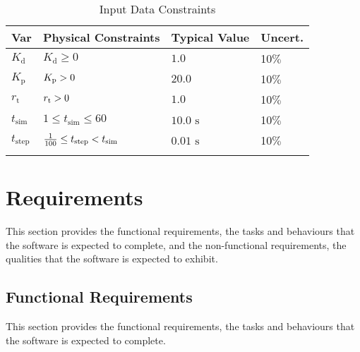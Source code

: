 \documentclass[12pt]{article}
\newcommand{\gt}{\ensuremath >}
\newcommand{\lt}{\ensuremath <}
\begin{document}
\begin{longtable}{l l l l}
\toprule
\textbf{Var} & \textbf{Physical Constraints} & \textbf{Typical Value} & \textbf{Uncert.}
\\
\midrule
\endhead
${K_{\text{d}}}$ & ${K_{\text{d}}}\geq{}0$ & $1.0$ & 10$\%$
\\
${K_{\text{p}}}$ & ${K_{\text{p}}}\gt{}0$ & $20.0$ & 10$\%$
\\
${r_{\text{t}}}$ & ${r_{\text{t}}}\gt{}0$ & $1.0$ & 10$\%$
\\
${t_{\text{sim}}}$ & $1\leq{}{t_{\text{sim}}}\leq{}60$ & $10.0$ ${\text{s}}$ & 10$\%$
\\
${t_{\text{step}}}$ & $\frac{1}{100}\leq{}{t_{\text{step}}}\lt{}{t_{\text{sim}}}$ & $0.01$ ${\text{s}}$ & 10$\%$
\\
\bottomrule
\caption{Input Data Constraints}
\label{Table:InDataConstraints}
\end{longtable}
\section{Requirements}
\label{Sec:Requirements}
This section provides the functional requirements, the tasks and behaviours that the software is expected to complete, and the non-functional requirements, the qualities that the software is expected to exhibit.

\subsection{Functional Requirements}
\label{Sec:FRs}
This section provides the functional requirements, the tasks and behaviours that the software is expected to complete.
\end{document}
